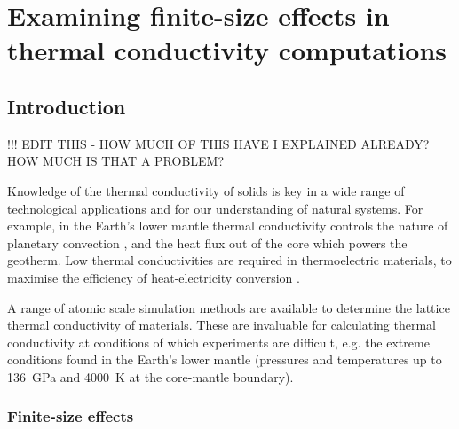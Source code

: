 
\chapter{Examining finite-size effects in thermal conductivity computations} %

\label{Chapter3} %

\section{\label{sec:3.intro}Introduction}

!!! EDIT THIS - HOW MUCH OF THIS HAVE I EXPLAINED ALREADY? HOW MUCH IS THAT A PROBLEM?

Knowledge of the thermal conductivity of solids is key in a wide range of technological applications and for our understanding of natural systems. For example, in the Earth's lower mantle thermal conductivity controls the nature of planetary convection \citep{Tosi2013}, and the heat flux out of the core which powers the geotherm. Low thermal conductivities are required in thermoelectric materials, to maximise the efficiency of heat-electricity conversion \citep{Snyder2008}.

A range of atomic scale simulation methods are available to determine the lattice thermal conductivity of materials. These are invaluable for calculating thermal conductivity at conditions of which experiments are difficult, e.g. the extreme conditions found in the Earth's lower mantle (pressures and temperatures up to 136~GPa and 4000~K at the core-mantle boundary).


\subsection{\label{sec:3.FSE}Finite-size effects}

